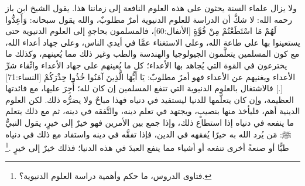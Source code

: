 ولا يزال علماء السنة يحثون على هذه العلوم النافعة إلى زماننا هذا.  يقول الشيخ ابن باز رحمه الله: لا شكَّ أن الدراسة للعلوم الدنيوية أمرٌ مطلوبٌ، والله يقول سبحانه: وَأَعِدُّوا لَهُمْ مَا اسْتَطَعْتُمْ مِنْ قُوَّةٍ [الأنفال:60]، فالمسلمون بحاجةٍ إلى العلوم الدنيوية حتى يستعينوا بها على طاعة الله، وعلى الاستغناء عمَّا في أيدي الناس، وعلى جهاد أعداء الله، مع كون المسلمين يتعلَّمون الجيولوجيا والهندسة والطب وغير ذلك مما يُعينهم، وكذلك ما يخترعون في القوة التي يُجاهد بها الأعداء؛ كل ما يُعينهم على جهاد الأعداء واتِّقاء شرِّ الأعداء ويغنيهم عن الأعداء فهو أمرٌ مطلوبٌ: يَا أَيُّهَا الَّذِينَ آمَنُوا خُذُوا حِذْرَكُمْ [النساء:71] [.] فالاشتغال بالعلوم الدنيوية التي تنفع المسلمين إن كان لله؛ أُجِرَ عليها، مع فائدتها العظيمة، وإن كان يتعلَّمها للدنيا ليستفيد في دنياه فهذا مباحٌ ولا يضرُّه ذلك. لكن العلوم الدينية أهم، فليأخذ منها بنصيبٍ، ويجتهد في تعلم دينه، والتَّفقه في دينه، ثم مع ذلك يتعلم ما ينفعه في دنياه إذا استطاع ذلك، وإذا جمع بين الأمرين فهو خيرٌ إلى خيرٍ، يقول النبيُّ ﷺ: مَن يُرد الله به خيرًا يُفقهه في الدين، فإذا تفقَّه في دينه واستفاد مع ذلك في دنياه طبًّا أو صنعةً أخرى تنفعه أو أشياء مما ينفع العبدَ في هذه الدنيا؛ فذلك خيرٌ إلى خيرٍ  \href{https://www.youtube.com/watch?v=soOBNJPR0E8}{\faExternalLink}.\footnote{فتاوى الدروس، ما حكم وأهمية دراسة العلوم الدنيوية؟.}

